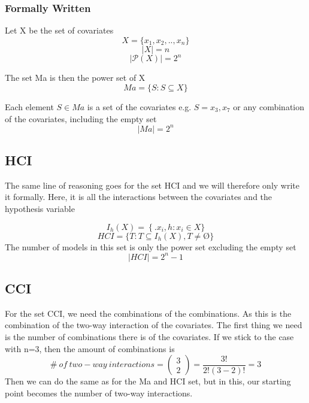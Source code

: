 \subsubsection{Formally Written} \break 
\noindent Let X be the set of covariates 
\[X=\{\left.x_1,x_2,..,x_n\right.\}\] 
\[\left|X\right|=n\] 
\[\left|\mathcal{P}\left(X\right)\right|=2^n\] 

\noindent The set Ma is then the power set of X 
\[Ma=\{\left.S:S\subseteq X\right.\}\] 

Each element $S\in Ma$ is a set of the covariates e.g. $S=\left.x_3,x_7\right.$ or any combination of the covariates, including the empty set
\[\left|Ma\right|=2^n\] 
\subsection{HCI}

The same line of reasoning goes for the set HCI and we will therefore only write it formally. Here, it is all the interactions between the covariates and the hypothesis variable 

\[I_h(X)=\left.\left\{.x_i,h\right.:x_i\in X\right.\}\] 
\[HCI=\left.\{T:T\subseteq I_h\left(X\right),T\neq \textrm{\O}\right.\}\] 
The number of models in this set is only the power set excluding the empty set
\[\left|HCI\right|\boldsymbol{=}2^n-1\] 

\subsection{CCI}

For the set CCI, we need the combinations of the combinations. As this is the combination of the two-way interaction of the covariates. The first thing we need is the number of combinations there is of the covariates. If we stick to the case with n=3, then the amount of combinations is 
\[\#\ of\ two-way\ interactions=\left( \begin{array}{c}
3 \\ 
2 \end{array}
\right)=\frac{3!}{2!\left(3-2\right)!}=3\] 
Then we can do the same as for the Ma and HCI set, but in this, our starting point becomes the number of two-way interactions. 

